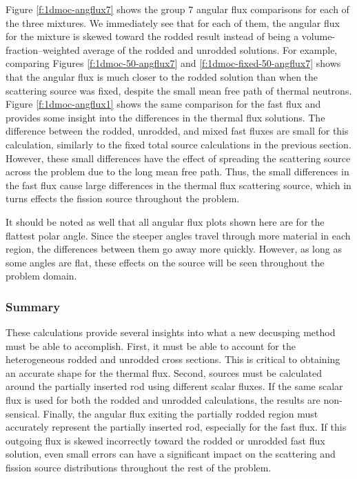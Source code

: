 Figure \ref{f:1dmoc-angflux7} shows the group 7 angular flux comparisons for each of the three mixtures.  We immediately see that for each of them, the angular flux for the mixture is skewed toward the rodded result instead of being a volume-fraction--weighted average of the rodded and unrodded solutions.  For example, comparing Figures \ref{f:1dmoc-50-angflux7} and \ref{f:1dmoc-fixed-50-angflux7} shows that the angular flux is much closer to the rodded solution than when the scattering source was fixed, despite the small mean free path of thermal neutrons.  Figure \ref{f:1dmoc-angflux1} shows the same comparison for the fast flux and provides some insight into the differences in the thermal flux solutions.  The difference between the rodded, unrodded, and mixed fast fluxes are small for this calculation, similarly to the fixed total source calculations in the previous section.  However, these small differences have the effect of spreading the scattering source across the problem due to the long mean free path.  Thus, the small differences in the fast flux cause large differences in the thermal flux scattering source, which in turns effects the fission source throughout the problem.

It should be noted as well that all angular flux plots shown here are for the flattest polar angle.  Since the steeper angles travel through more material in each region, the differences between them go away more quickly.  However, as long as some angles are flat, these effects on the source will be seen throughout the problem domain.

\subsubsection{Summary}

These calculations provide several insights into what a new decusping method must be able to accomplish.  First, it must be able to account for the heterogeneous rodded and unrodded cross sections.  This is critical to obtaining an accurate shape for the thermal flux.  Second, sources must be calculated around the partially inserted rod using different scalar fluxes.  If the same scalar flux is used for both the rodded and unrodded calculations, the results are non-sensical.  Finally, the angular flux exiting the partially rodded region must accurately represent the partially inserted rod, especially for the fast flux.  If this outgoing flux is skewed incorrectly toward the rodded or unrodded fast flux solution, even small errors can have a significant impact on the scattering and fission source distributions throughout the rest of the problem.

